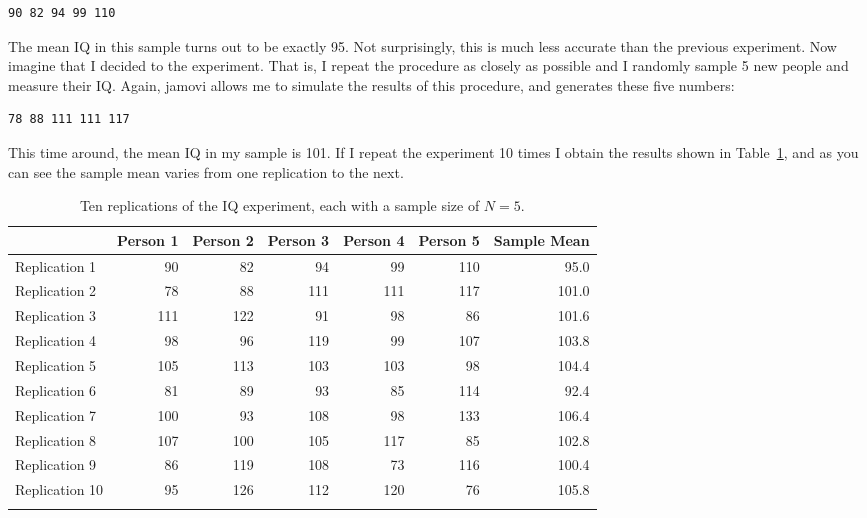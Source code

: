 \begin{verbatim}
90 82 94 99 110
\end{verbatim}

The mean IQ in this sample turns out to be exactly 95. Not surprisingly, this is much less accurate than the previous experiment. Now imagine that I decided to  the experiment. That is, I repeat the procedure as closely as possible and I randomly sample 5 new people and measure their IQ. Again, jamovi allows me to simulate the results of this procedure, and generates these five numbers:

\begin{verbatim}
78 88 111 111 117
\end{verbatim}

This time around, the mean IQ in my sample is 101. If I repeat the experiment 10 times I obtain the results shown in Table~\ref{tab:replications}, and as you can see the sample mean varies from one replication to the next. 

\begin{table}[t]
\centering
\caption{Ten replications of the IQ experiment, each with a sample size of $N=5$.}
\label{tab:replications}
\begin{tabular}{lrrrrrr}
\hline
~              & Person 1 & Person 2 & Person 3 & Person 4 & Person 5 & Sample Mean \\ 
\hline
Replication  1 &       90 &       82 &       94 &       99 &      110 &        95.0 \\ 
Replication  2 &       78 &       88 &      111 &      111 &      117 &       101.0 \\ 
Replication  3 &      111 &      122 &       91 &       98 &       86 &       101.6 \\ 
Replication  4 &       98 &       96 &      119 &       99 &      107 &       103.8 \\ 
Replication  5 &      105 &      113 &      103 &      103 &       98 &       104.4 \\ 
Replication  6 &       81 &       89 &       93 &       85 &      114 &        92.4 \\ 
Replication  7 &      100 &       93 &      108 &       98 &      133 &       106.4 \\ 
Replication  8 &      107 &      100 &      105 &      117 &       85 &       102.8 \\ 
Replication  9 &       86 &      119 &      108 &       73 &      116 &       100.4 \\ 
Replication 10 &       95 &      126 &      112 &      120 &       76 &       105.8 \\ 
\hline
\\
\end{tabular}
\end{table}

